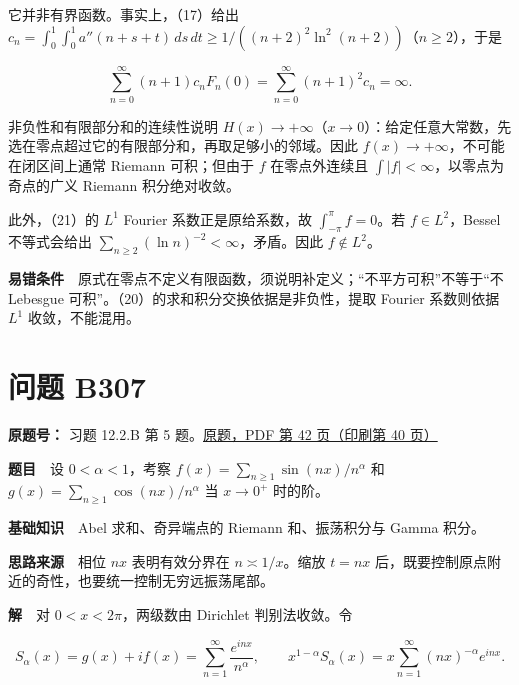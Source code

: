 \documentclass[11pt,a4paper]{article}
\begin{document}
它并非有界函数。事实上，（17）给出
\(c_n=\int_0^1\int_0^1a''(n+s+t)\,ds\,dt\ge1/((n+2)^2\ln^2(n+2))\)（\(n\ge2\)），于是

\begin{equation}
\sum_{n=0}^{\infty}(n+1)c_nF_n(0)
=\sum_{n=0}^{\infty}(n+1)^2c_n=\infty.
\tag{22}
\end{equation}

非负性和有限部分和的连续性说明
\(H(x)\to+\infty\)（\(x\to0\)）：给定任意大常数，先选在零点超过它的有限部分和，再取足够小的邻域。因此
\(f(x)\to+\infty\)，不可能在闭区间上通常 Riemann 可积；但由于 \(f\)
在零点外连续且 \(\int|f|<\infty\)，以零点为奇点的广义 Riemann
积分绝对收敛。

此外，（21）的 \(L^1\) Fourier 系数正是原给系数，故
\(\int_{-\pi}^{\pi}f=0\)。若 \(f\in L^2\)，Bessel 不等式会给出
\(\sum_{n\ge2}(\ln n)^{-2}<\infty\)，矛盾。因此 \(f\notin L^2\)。

\textbf{易错条件}　原式在零点不定义有限函数，须说明补定义；``不平方可积''不等于``不
Lebesgue 可积''。（20）的求和积分交换依据是非负性，提取 Fourier
系数则依据 \(L^1\) 收敛，不能混用。

\section{问题 B307}\label{ux95eeux9898-b307}

\textbf{原题号：} 习题 12.2.B 第 5
题。\href{https://zj139.github.io/math-notes/files/problems/楼分析习题-v2.pdf\#page=42}{原题，PDF
第 42 页（印刷第 40 页）}

\textbf{题目}　设 \(0<\alpha<1\)，考察
\(f(x)=\sum_{n\ge1}\sin(nx)/n^\alpha\) 和
\(g(x)=\sum_{n\ge1}\cos(nx)/n^\alpha\) 当 \(x\to0^+\) 时的阶。

\textbf{基础知识}　Abel 求和、奇异端点的 Riemann 和、振荡积分与 Gamma
积分。

\textbf{思路来源}　相位 \(nx\) 表明有效分界在 \(n\asymp1/x\)。缩放
\(t=nx\) 后，既要控制原点附近的奇性，也要统一控制无穷远振荡尾部。

\textbf{解}　对 \(0<x<2\pi\)，两级数由 Dirichlet 判别法收敛。令

\begin{equation}
S_\alpha(x)=g(x)+if(x)=\sum_{n=1}^{\infty}\frac{e^{inx}}{n^\alpha},
\qquad
x^{1-\alpha}S_\alpha(x)=x\sum_{n=1}^{\infty}(nx)^{-\alpha}e^{inx}.
\tag{23}
\end{equation}
\end{document}
